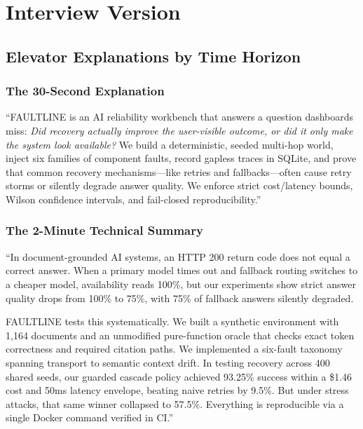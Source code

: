 \section{Interview Version}

\subsection{Elevator Explanations by Time Horizon}

\subsubsection{The 30-Second Explanation}
``FAULTLINE is an AI reliability workbench that answers a question dashboards miss: \textit{Did recovery actually improve the user-visible outcome, or did it only make the system look available?} We build a deterministic, seeded multi-hop world, inject six families of component faults, record gapless traces in SQLite, and prove that common recovery mechanisms---like retries and fallbacks---often cause retry storms or silently degrade answer quality. We enforce strict cost/latency bounds, Wilson confidence intervals, and fail-closed reproducibility.''

\subsubsection{The 2-Minute Technical Summary}
``In document-grounded AI systems, an HTTP 200 return code does not equal a correct answer. When a primary model times out and fallback routing switches to a cheaper model, availability reads 100\%, but our experiments show strict answer quality drops from 100\% to 75\%, with 75\% of fallback answers silently degraded. 

FAULTLINE tests this systematically. We built a synthetic environment with 1,164 documents and an unmodified pure-function oracle that checks exact token correctness and required citation paths. We implemented a six-fault taxonomy spanning transport to semantic context drift. In testing recovery across 400 shared seeds, our guarded cascade policy achieved 93.25\% success within a \$1.46 cost and 50ms latency envelope, beating naive retries by 9.5\%. But under stress attacks, that same winner collapsed to 57.5\%. Everything is reproducible via a single Docker command verified in CI.''

